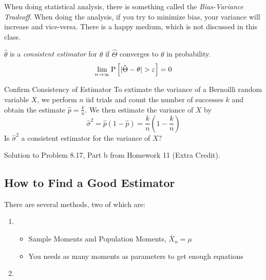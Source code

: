 \begin{remark*}
  When doing statistical analysis, there is something called the \emph{Bias-Variance Tradeoff}.
  When doing the analysis, if you try to minimize bias, your variance will increase and vice-versa.
  There is a happy medium, which is not discussed in this class.
\end{remark*}

\begin{definition}[Consistency]\label{def:Consistency}
  $\hat{\theta}$ is a \emph{consistent estimator} for $\theta$ if $\hat{\Theta}$ converges to $\theta$ in probability.
  \begin{equation}\label{eq:Consistency}
    \lim\limits_{n \rightarrow \infty} \operatorname{\operatorname{P}} \left[ \lvert \hat{\Theta} - \theta \rvert > \varepsilon \right] = 0
  \end{equation}
\end{definition}
\begin{example}[Problem 8.17]{Confirm Consistency of Estimator}
  To extimate the variance of a Bernoilli random variable $X$, we perform $n$ iid trials and count the number of successes $k$ and obtain the estimate $\hat{p} = \frac{k}{n}$.
  We then estimate the variance of $X$ by
  \begin{equation*}
    \hat{\sigma}^{2} = \hat{p} \left( 1-\hat{p} \right) = \frac{k}{n} \left( 1- \frac{k}{n} \right)
  \end{equation*}
  Is $\hat{\sigma}^{2}$ a consistent estimator for the variance of $X$?

  \tcblower

  Solution to Problem 8.17, Part b from Homework 11 (Extra Credit).
\end{example}

\subsection{How to Find a Good Estimator}\label{subsec:Find Good Estimator}
There are several methods, two of which are:
\begin{enumerate}
\item {}
  \begin{itemize}[noitemsep, nolistsep]
  \item Sample Moments and Population Moments, $\bar{X}_{n} = \mu$
  \item You needs as many moments as parameters to get enough equations
  \end{itemize}
\item {}
\end{enumerate}

